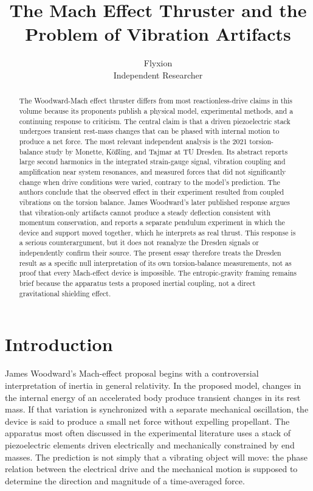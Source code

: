 \documentclass[11pt]{article}
\title{The Mach Effect Thruster and the Problem of Vibration Artifacts}
\author{Flyxion \\ \small Independent Researcher}
\date{}
\begin{document}
\maketitle

\begin{abstract}
The Woodward-Mach effect thruster differs from most reactionless-drive claims in this volume because its proponents publish a physical model, experimental methods, and a continuing response to criticism. The central claim is that a driven piezoelectric stack undergoes transient rest-mass changes that can be phased with internal motion to produce a net force. The most relevant independent analysis is the 2021 torsion-balance study by Monette, Kößling, and Tajmar at TU Dresden. Its abstract reports large second harmonics in the integrated strain-gauge signal, vibration coupling and amplification near system resonances, and measured forces that did not significantly change when drive conditions were varied, contrary to the model's prediction. The authors conclude that the observed effect in their experiment resulted from coupled vibrations on the torsion balance. James Woodward's later published response argues that vibration-only artifacts cannot produce a steady deflection consistent with momentum conservation, and reports a separate pendulum experiment in which the device and support moved together, which he interprets as real thrust. This response is a serious counterargument, but it does not reanalyze the Dresden signals or independently confirm their source. The present essay therefore treats the Dresden result as a specific null interpretation of its own torsion-balance measurements, not as proof that every Mach-effect device is impossible. The entropic-gravity framing remains brief because the apparatus tests a proposed inertial coupling, not a direct gravitational shielding effect.
\end{abstract}

\section{Introduction}

James Woodward's Mach-effect proposal begins with a controversial interpretation of inertia in general relativity. In the proposed model, changes in the internal energy of an accelerated body produce transient changes in its rest mass. If that variation is synchronized with a separate mechanical oscillation, the device is said to produce a small net force without expelling propellant. The apparatus most often discussed in the experimental literature uses a stack of piezoelectric elements driven electrically and mechanically constrained by end masses. The prediction is not simply that a vibrating object will move: the phase relation between the electrical drive and the mechanical motion is supposed to determine the direction and magnitude of a time-averaged force.
\end{document}
